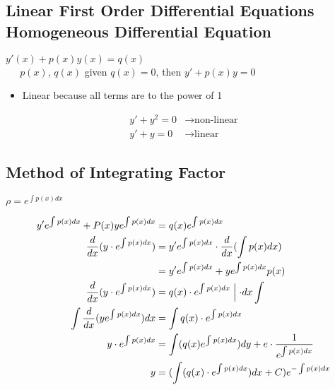 \documentclass[10pt, letterpaper]{article}
\begin{document}
\subsection{Linear First Order Differential Equations Homogeneous Differential Equation}

$y'(x) + p(x)y(x) = q(x)$\\
$~~~~~$ $p(x)$, $q(x)$ given $q(x)=0$, then $y'+p(x)y = 0$

\begin{itemize}
	\item Linear because all terms are to the power of 1
\end{itemize}

\begin{align*}
y'+y^2 = 0 &\rightarrow \text{non-linear}\\
y'+y = 0 &\rightarrow \text{linear}
\end{align*}

\subsection{Method of Integrating Factor}
$\rho = e^{\int \limits p(x) dx}$

\begin{align*}
y'e^{\int \limits p(x) dx} + P(x)ye^{\int \limits p(x) dx} &= q(x)e^{\int \limits p(x) dx}\\
\frac{d}{dx}(y \cdot e^{\int \limits p(x) dx}) &= y'e^{\int \limits p(x) dx} \cdot \frac{d}{dx} (\int \limits p(x) dx)\\
&= y'e^{\int \limits p(x) dx} + ye^{\int \limits p(x) dx} p(x)\\
\frac{d}{dx}(y \cdot e^{\int \limits p(x) dx}) &= q(x) \cdot e^{\int \limits p(x) dx} \Bigm\lvert \cdot dx \int \limits\\
\int \limits \frac{d}{dx} (ye^{\int \limits p(x) dx})dx &= \int \limits q(x) \cdot e^{\int \limits p(x) dx}\\
y \cdot e^{\int \limits p(x) dx} &= \int \limits (q(x) e^{\int \limits p(x) dx})dy + e  \cdot \frac{1}{e^{\int \limits p(x) dx}}\\
y &= (\int \limits (q(x) \cdot e^{\int \limits p(x) dx})dx + C)e^{-\int \limits p(x) dx}
\end{align*}
\end{document}
